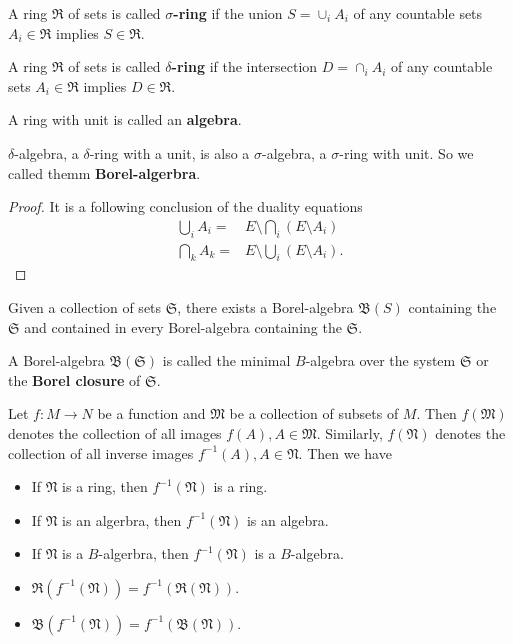 \begin{definition}
A ring $\mathfrak{R}$ of sets is called \textbf{$\sigma$-ring} if the union $S=\cup_iA_i$ of any countable sets $A_i\in\mathfrak{R}$ implies $S\in\mathfrak{R}$.

A ring $\mathfrak{R}$ of sets is called \textbf{$\delta$-ring} if the intersection $D=\cap_iA_i$ of any countable sets $A_i\in\mathfrak{R}$ implies $D\in\mathfrak{R}$.

A ring with unit is called an \textbf{algebra}.
\end{definition}

\begin{theorem}
$\delta$-algebra, a $\delta$-ring with a unit, is also a $\sigma$-algebra, a $\sigma$-ring with unit. So we called themm \textbf{Borel-algerbra}.
\end{theorem}
\begin{proof}
It is a following conclusion of the duality equations
\begin{equation}
\begin{aligned}
\bigcup_iA_i=&E\setminus \bigcap_i(E\setminus A_i)\\
\bigcap_kA_k=&E\setminus \bigcup_i(E\setminus A_i).
\end{aligned}
\end{equation}
\end{proof}

\begin{theorem}
Given a collection of sets $\mathfrak{S}$, there exists a Borel-algebra $\mathfrak{B}(S)$ containing the $\mathfrak{S}$ and contained in every Borel-algebra containing the $\mathfrak{S}$.
\end{theorem}

A Borel-algebra $\mathfrak{B}(\mathfrak{S})$ is called the minimal $B$-algebra over the system $\mathfrak{S}$ or the \textbf{Borel closure} of $\mathfrak{S}$.

\begin{theorem}
Let $f:M\to N$ be a function and $\mathfrak{M}$ be a collection of subsets of $M$. Then $f(\mathfrak{M})$ denotes the collection of all images $f(A),A\in\mathfrak{M}$. Similarly, $f(\mathfrak{N})$ denotes the collection of all inverse images $f^{-1}(A),A\in\mathfrak{N}$. Then we have
\begin{itemize}
\item If $\mathfrak{N}$ is a ring, then $f^{-1}(\mathfrak{N})$ is a ring.
\item If $\mathfrak{N}$ is an algerbra, then $f^{-1}(\mathfrak{N})$ is an algebra.
\item If $\mathfrak{N}$ is a $B$-algerbra, then $f^{-1}(\mathfrak{N})$ is a $B$-algebra.
\item $\mathfrak{R}(f^{-1}(\mathfrak{N}))=f^{-1}(\mathfrak{R}(\mathfrak{N}))$.
\item $\mathfrak{B}(f^{-1}(\mathfrak{N}))=f^{-1}(\mathfrak{B}(\mathfrak{N}))$.
\end{itemize}
\end{theorem}


